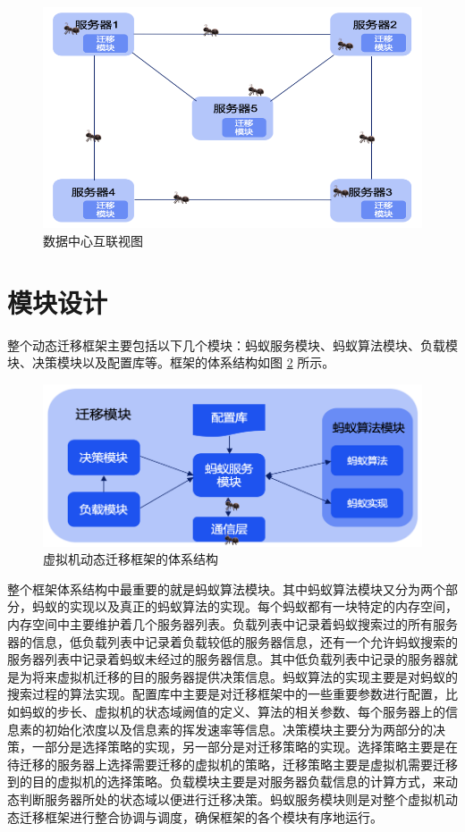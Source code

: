 \begin{figure}[ht]
  \centering
  \includegraphics{./Figure/IMG_Chap3_1.png}
  \caption{数据中心互联视图}\label{Fig:chap3_1}
\end{figure}

\section{模块设计}
整个动态迁移框架主要包括以下几个模块：蚂蚁服务模块、蚂蚁算法模块、负载模块、决策模块以及配置库等。框架的体系结构如图 \ref{Fig:chap3_2} 所示。

\begin{figure}[ht]
  \centering
  \includegraphics{./Figure/IMG_Chap3_2.png}
  \caption{虚拟机动态迁移框架的体系结构}\label{Fig:chap3_2}
\end{figure}

整个框架体系结构中最重要的就是蚂蚁算法模块。其中蚂蚁算法模块又分为两个部分，蚂蚁的实现以及真正的蚂蚁算法的实现。每个蚂蚁都有一块特定的内存空间，内存空间中主要维护着几个服务器列表。负载列表中记录着蚂蚁搜索过的所有服务器的信息，低负载列表中记录着负载较低的服务器信息，还有一个允许蚂蚁搜索的服务器列表中记录着蚂蚁未经过的服务器信息。其中低负载列表中记录的服务器就是为将来虚拟机迁移的目的服务器提供决策信息。蚂蚁算法的实现主要是对蚂蚁的搜索过程的算法实现。配置库中主要是对迁移框架中的一些重要参数进行配置，比如蚂蚁的步长、虚拟机的状态域阙值的定义、算法的相关参数、每个服务器上的信息素的初始化浓度以及信息素的挥发速率等信息。决策模块主要分为两部分的决策，一部分是选择策略的实现，另一部分是对迁移策略的实现。选择策略主要是在待迁移的服务器上选择需要迁移的虚拟机的策略，迁移策略主要是虚拟机需要迁移到的目的虚拟机的选择策略。负载模块主要是对服务器负载信息的计算方式，来动态判断服务器所处的状态域以便进行迁移决策。蚂蚁服务模块则是对整个虚拟机动态迁移框架进行整合协调与调度，确保框架的各个模块有序地运行。

